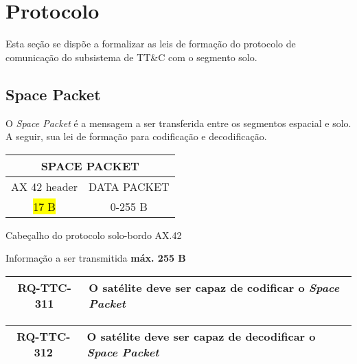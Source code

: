\section{Protocolo}

Esta seção se dispõe a formalizar as leis de formação do protocolo de comunicação do subsistema de TT\&C com o segmento solo.

\subsection{Space Packet}

O \textit{Space Packet} é a mensagem a ser transferida entre os segmentos espacial e solo.
A seguir, sua lei de formação para codificação e decodificação.

\begin{table}[H]
\centering
\begin{tabular}{|c|c|}
\hline
\multicolumn{2}{|c|}{SPACE PACKET} \\ \hline
AX 42 header & DATA PACKET \\ \hline
\hl{17 B} & 0-255 B \\ \hline
\end{tabular}%
\end{table}

\begin{description}[align=right]
    \item[AX42 head] Cabeçalho do protocolo solo-bordo AX.42
    \item[Data Pckt] Informação a ser transmitida \textbf{máx. 255 B}
\end{description}

\begin{table}[H]
    \centering
    \begin{tabular}{|c|p{}|}
        \hline
        \rowcolor{orange}
        \textbf{RQ-TTC-311} & \textbf{O satélite deve ser capaz de codificar o \textit{Space Packet}} \\ \hline
    \end{tabular}
    \label{tab:rq-ttc-311}
\end{table}

\begin{table}[H]
    \centering
    \begin{tabular}{|c|p{}|}
        \hline
        \rowcolor{orange}
        \textbf{RQ-TTC-312} & \textbf{O satélite deve ser capaz de decodificar o \textit{Space Packet}} \\ \hline
    \end{tabular}
    \label{tab:rq-ttc-312}
\end{table}

